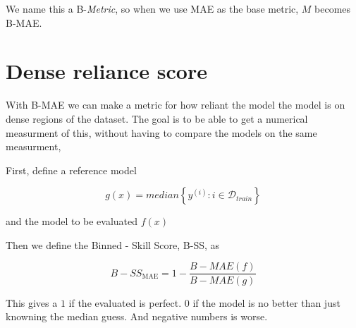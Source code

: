 \documentclass{article} %
\begin{document}
We name this a B-\emph{Metric}, so when we use \ac{MAE} as the base metric, \(M\) becomes B-\ac{MAE}.


\section{Dense reliance score}
With B-\ac{MAE} we can make a metric for how reliant the model the model is on dense regions of the dataset. The goal is to be able to get a numerical measurment of this, without having to compare the models on the same measurment,

First, define a reference model

\begin{equation}
    g(x) = median\left\{ y^{(i)}: i\in \mathcal{D}_{train} \right\}
\end{equation}


and the model to be evaluated \(f(x)\)



Then we define the Binned - Skill Score, B-SS, as

\begin{equation}
    B-SS_{\text{MAE}} = 1 - \frac{B-MAE(f)}{B-MAE(g)}
\end{equation}

This gives a \(1\) if the evaluated is perfect. \(0\) if the model is no better than just knowning the median guess. And negative numbers is worse.



\printbibliography
\end{document}
